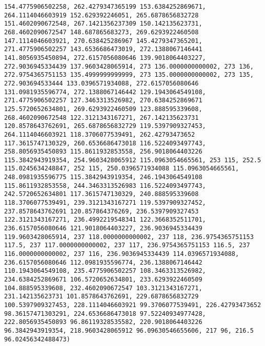 \documentclass{article}
\begin{document}
\begin{Verbatim}[commandchars=\\\{\}]
154.4775906502258, 262.4279347365199 153.6384252869671, 264.1114046603919 152.629392246051, 265.6878656832728 151.4602090672548, 267.1421356237309 150.142135623731, 268.4602090672547 148.687865683273, 269.6293922460508 147.1114046603921, 270.638425286967 145.4279347365201, 271.4775906502257 143.6536686473019, 272.1388067146441 141.8056935450894, 272.6157056080646 139.9018064403227, 272.9036945334439 137.9603428065914, 273 136.0000000000002, 273 136, 272.9754365751153 135.4999999999999, 273 135.0000000000002, 273 135, 272.903694533444 133.0396571934088, 272.6157056080646 131.0981935596774, 272.1388067146442 129.1943064549108, 271.4775906502257 127.3463313526982, 270.6384252869671 125.5720652634801, 269.6293922460509 123.888595339608, 268.4602090672548 122.3121343167271, 267.142135623731 120.8578643762691, 265.6878656832729 119.5397909327453, 264.1114046603921 118.3706077539491, 262.42793473652 117.3615747130329, 260.6536686473018 116.5224093497743, 258.8056935450893 115.8611932853558, 256.9018064403226 115.3842943919354, 254.9603428065912 115.0963054665561, 253 115, 252.5 115.0245634248847, 252 115, 250.0396571934088 115.0963054665561, 248.0981935596775 115.3842943919354, 246.1943064549108 115.8611932853558, 244.3463313526983 116.5224093497743, 242.5720652634801 117.3615747130329, 240.888595339608 118.3706077539491, 239.3121343167271 119.5397909327452, 237.8578643762691 120.857864376269, 236.5397909327453 122.3121343167271, 236.4992219548341 122.3668352511701, 236.6157056080646 121.9018064403227, 236.9036945334439 119.9603428065914, 237 118.0000000000002, 237 118, 236.9754365751153 117.5, 237 117.0000000000002, 237 117, 236.9754365751153 116.5, 237 116.0000000000002, 237 116, 236.9036945334439 114.0396571934088, 236.6157056080646 112.0981935596774, 236.1388067146442 110.1943064549108, 235.4775906502257 108.3463313526982, 234.6384252869671 106.5720652634801, 233.6293922460509 104.888595339608, 232.4602090672547 103.3121343167271, 231.142135623731 101.8578643762691, 229.6878656832729 100.5397909327453, 228.1114046603921 99.3706077539491, 226.42793473652 98.36157471303291, 224.6536686473018 97.52240934977428, 222.8056935450893 96.86119328535582, 220.9018064403226 96.3842943919354, 218.9603428065912 96.09630546655606, 217 96, 216.5 96.02456342488473)

\end{Verbatim}
\end{document}
